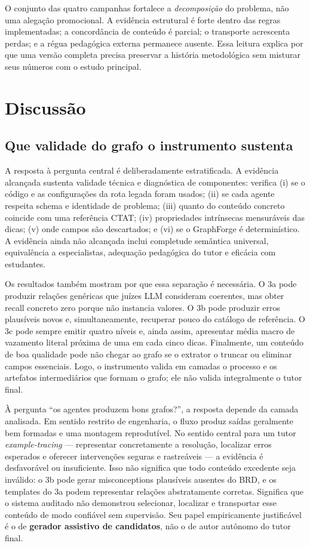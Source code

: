 \documentclass[11pt,a4paper]{article}
\begin{document}
O conjunto das quatro campanhas fortalece a \emph{decomposição} do problema, não uma alegação promocional. A evidência estrutural é forte dentro das regras implementadas; a concordância de conteúdo é parcial; o transporte acrescenta perdas; e a régua pedagógica externa permanece ausente. Essa leitura explica por que uma versão completa precisa preservar a história metodológica sem misturar seus números com o estudo principal.

\section{Discussão}

\subsection{Que validade do grafo o instrumento sustenta}

A resposta à pergunta central é deliberadamente estratificada. A evidência alcançada sustenta validade técnica e diagnóstica de componentes: verifica (i) se o código e as configurações da rota legada foram usados; (ii) se cada agente respeita schema e identidade de problema; (iii) quanto do conteúdo concreto coincide com uma referência CTAT; (iv) propriedades intrínsecas mensuráveis das dicas; (v) onde campos são descartados; e (vi) se o GraphForge é determinístico. A evidência ainda não alcançada inclui completude semântica universal, equivalência a especialistas, adequação pedagógica do tutor e eficácia com estudantes.

Os resultados também mostram por que essa separação é necessária. O 3a pode produzir relações genéricas que juízes LLM consideram coerentes, mas obter recall concreto zero porque não instancia valores. O 3b pode produzir erros plausíveis novos e, simultaneamente, recuperar pouco do catálogo de referência. O 3c pode sempre emitir quatro níveis e, ainda assim, apresentar média macro de vazamento literal próxima de uma em cada cinco dicas. Finalmente, um conteúdo de boa qualidade pode não chegar ao grafo se o extrator o truncar ou eliminar campos essenciais. Logo, o instrumento valida em camadas o processo e os artefatos intermediários que formam o grafo; ele não valida integralmente o tutor final.

À pergunta ``os agentes produzem bons grafos?'', a resposta depende da camada analisada. Em sentido restrito de engenharia, o fluxo produz saídas geralmente bem formadas e uma montagem reprodutível. No sentido central para um tutor \emph{example-tracing} --- representar concretamente a resolução, localizar erros esperados e oferecer intervenções seguras e rastreáveis --- a evidência é desfavorável ou insuficiente. Isso não significa que todo conteúdo excedente seja inválido: o 3b pode gerar misconceptions plausíveis ausentes do BRD, e os templates do 3a podem representar relações abstratamente corretas. Significa que o sistema auditado não demonstrou selecionar, localizar e transportar esse conteúdo de modo confiável sem supervisão. Seu papel empiricamente justificável é o de \textbf{gerador assistivo de candidatos}, não o de autor autônomo do tutor final.
\end{document}
